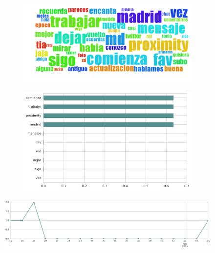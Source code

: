 \begin{figure}[htbp!]
    \centering
    \begin{subfigure}[b]{0.49\textwidth}
        \includegraphics[width=\textwidth]{twitter_murcia/report_images/topic-04-wordcloud.jpg}
    \end{subfigure}
    \begin{subfigure}[b]{0.49\textwidth}
        \includegraphics[width=\textwidth]{twitter_murcia/report_images/topic-04-terms.jpg}
    \end{subfigure}
\end{figure}

\begin{figure}[htbp!]
    \centering
    \includegraphics[width=\textwidth]{twitter_murcia/report_images/topic-04-timeseries.jpg}
\end{figure}


